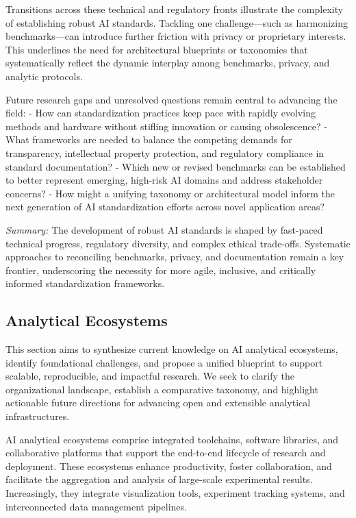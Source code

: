\documentclass[sigconf]{acmart}
\begin{document}
Transitions across these technical and regulatory fronts illustrate the complexity of establishing robust AI standards. Tackling one challenge—such as harmonizing benchmarks—can introduce further friction with privacy or proprietary interests. This underlines the need for architectural blueprints or taxonomies that systematically reflect the dynamic interplay among benchmarks, privacy, and analytic protocols.

Future research gaps and unresolved questions remain central to advancing the field:
- How can standardization practices keep pace with rapidly evolving methods and hardware without stifling innovation or causing obsolescence?
- What frameworks are needed to balance the competing demands for transparency, intellectual property protection, and regulatory compliance in standard documentation?
- Which new or revised benchmarks can be established to better represent emerging, high-risk AI domains and address stakeholder concerns?
- How might a unifying taxonomy or architectural model inform the next generation of AI standardization efforts across novel application areas?

\textit{Summary:} The development of robust AI standards is shaped by fast-paced technical progress, regulatory diversity, and complex ethical trade-offs. Systematic approaches to reconciling benchmarks, privacy, and documentation remain a key frontier, underscoring the necessity for more agile, inclusive, and critically informed standardization frameworks.

\subsection{Analytical Ecosystems}
This section aims to synthesize current knowledge on AI analytical ecosystems, identify foundational challenges, and propose a unified blueprint to support scalable, reproducible, and impactful research. We seek to clarify the organizational landscape, establish a comparative taxonomy, and highlight actionable future directions for advancing open and extensible analytical infrastructures.

AI analytical ecosystems comprise integrated toolchains, software libraries, and collaborative platforms that support the end-to-end lifecycle of research and deployment. These ecosystems enhance productivity, foster collaboration, and facilitate the aggregation and analysis of large-scale experimental results. Increasingly, they integrate visualization tools, experiment tracking systems, and interconnected data management pipelines.
\end{document}
